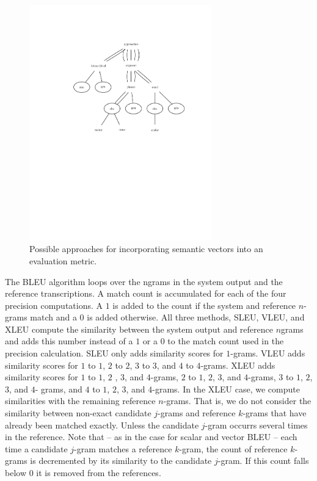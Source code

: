 %

\begin{figure}
  \centering
  \includegraphics[width=2.0\linewidth,height=4.0181in]{approaches.pdf}
  \caption{Possible approaches for incorporating semantic vectors into an evaluation metric.}
  \label{fig:approaches}
\end{figure}


The BLEU algorithm loops over the ngrams in the system output and the reference transcriptions. 
A match count is accumulated for each of the four precision computations. 
A $1$ is added to the count if the system and reference $n$-grams match and a $0$ is added otherwise. 
All three methods, SLEU, VLEU, and XLEU compute the similarity between the system output and reference $n$grams and adds this number instead of a $1$ or a $0$ to the match count used in the precision calculation. 
SLEU only adds similarity scores for $1$-grams. 
VLEU adds similarity scores for $1$ to $1$, $2$ to $2$, $3$ to $3$,  and $4$ to $4$-grams. 
XLEU adds similarity scores for $1$ to $1$, $2$ , $3$, and $4$-grams, $2$ to $1$, $2$, $3$, and $4$-grams, $3$ to $1$, $2$, $3$, and $4$- grams, and $4$ to $1$, $2$, $3$, and $4$-grams. 
In the XLEU case, we compute similarities with the remaining reference $n$-grams. 
That is, we do not consider the similarity between non-exact candidate $j$-grams and reference $k$-grams that have already been matched exactly. 
Unless the candidate $j$-gram occurrs several times in the reference. 
Note that -- as in the case for scalar and vector BLEU -- each time a candidate $j$-gram matches a reference $k$-gram, the count of reference $k$-grams is decremented by its similarity to the candidate $j$-gram. 
If this count falls below $0$ it is removed from the references. 

